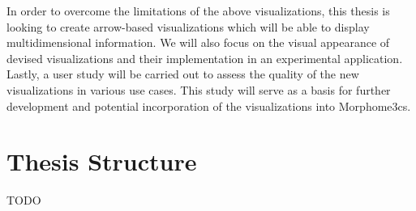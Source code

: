 In order to overcome the limitations of the above visualizations, this thesis is looking to create arrow-based visualizations which will be able to display multidimensional information. We will also focus on the visual appearance of devised visualizations and their implementation in an experimental application. Lastly, a user study will be carried out to assess the quality of the new visualizations in various use cases. This study will serve as a basis for further development and potential incorporation of the visualizations into Morphome3cs.
\section{Thesis Structure}

TODO